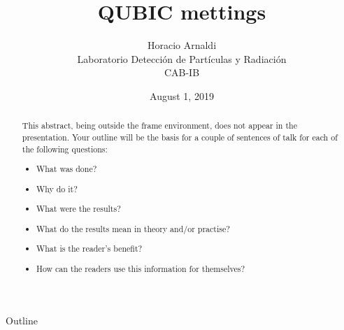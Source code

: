 \documentclass[ignorenonframetext,12pt]{beamer}
\title{QUBIC mettings}
\author{Horacio Arnaldi\\
Laboratorio Detecci\'on de Part\'iculas y Radiaci\'on\\
CAB-IB}
\date{August 1, 2019}
\begin{document}
\begin{frame}
				\maketitle
\end{frame}


\begin{abstract}
				This abstract, being outside the frame environment, does not appear in the presentation.  Your outline will be the basis for a couple of sentences of talk for each of the following questions:
				\begin{itemize}
								\item What was done?
								\item Why do it?
								\item What were the results?
								\item What do the results mean in theory and/or practise?
								\item What is the reader's benefit?
								\item How can the readers use this information for themselves? 
				\end{itemize}
\end{abstract}


\begin{frame}{Outline}
				\tableofcontents
\end{frame}
\end{document}
